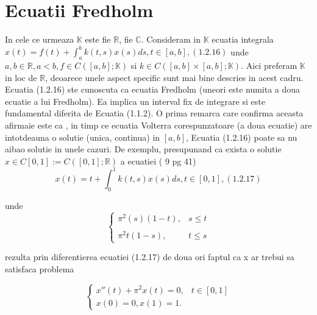 \documentclass[a4paper,12pt,oneside]{report}
\begin{document}
\section{Ecuatii Fredholm}

In cele ce urmeaza \(\mathbb{K}\) este fie \(\mathbb{R}\), fie \(\mathbb{C}\). Consideram in \(\mathbb{K}\) ecuatia integrala \(x\left ( t \right ) = f\left ( t \right ) + \int_{a}^{b}k\left ( t,s \right )x\left ( s \right )ds, t\in \left [ a,b \right ], (1.2.16)\)
unde \(a,b \in \mathbb{R}, a< b, f\in C\left ( \left [ a,b \right ]; \mathbb{K}\right )\) si \(k\in C\left ( \left [ a,b \right ] \times \left [ a,b \right ]; \mathbb{K}\right ).\) Aici preferam \(\mathbb{K}\) in loc de \(\mathbb{R}\), deoarece unele aspect specific sunt mai bine descries in acest cadru. Ecuatia (1.2.16) ste cunoscuta ca ecuatia Fredholm (uneori este numita a doua ecuatie a lui Fredholm). Ea implica un interval fix de integrare si este fundamental diferita de Ecuatia (1.1.2).  O prima remarca care confirma aceasta afirmaie este ca , in timp ce ecuatia Volterra corespunzatoare (a doua ecuatie) are intotdeauna o solutie (unica, continua) in \(\left [ a,b \right ]\), Ecuatia (1.2.16) poate sa nu aibao solutie in unele cazuri. De exemplu, presupunand ca exista o solutie \(x \in C\left [ 0,1 \right ] := C\left ( \left [ 0,1 \right ]; \mathbb{R} \right )\) a ecuatiei ( 9 pg 41) 
\begin{displaymath}
  x\left ( t \right ) = t + \int_{0}^{1} k\left ( t,s \right )x\left ( s \right )ds, t\in \left [ 0,1 \right ], (1.2.17)
\end{displaymath}

unde
\begin{displaymath}
  \left\{\begin{matrix}
\pi ^{2} \left ( s \right )\left ( 1-t \right ) , & s\leq t\\ 
 & \\ \pi ^{2}t\left ( 1-s \right ),  & t\leq s
\end{matrix}\right.
\end{displaymath}

rezulta prin diferentierea ecuatiei  (1.2.17) de doua ori faptul ca x ar trebui sa satisfaca problema 

\begin{displaymath}
  \left\{\begin{matrix}
{x}'' \left ( t \right ) + \pi ^{2}x\left ( t \right )  = 0, & t \in \left [ 0,1 \right ] \\ 
x\left ( 0 \right )  =  0, x \left ( 1 \right ) = 1.& 
\end{matrix}\right.
\end{displaymath}
\end{document}
